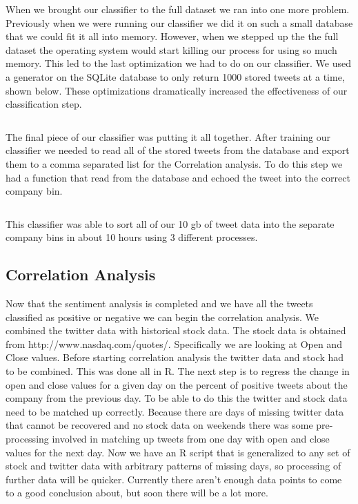 \documentclass{acm_proc_article-sp}
\begin{document}
When we brought our classifier to the full dataset we ran into one more problem. 
Previously when we were running our classifier we did it on such a small database that we 
could fit it all into memory. However, when we stepped up the the full dataset the operating
system would start killing our process for using so much memory. This led to the last
optimization we had to do on our classifier. We used a generator on the SQLite database
to only return 1000 stored tweets at a time, shown below. These optimizations dramatically 
increased the effectiveness of our classification step.

\inputminted{python}{examples/generator.py}

The final piece of our classifier was putting it all together. After training our classifier
we needed to read all of the stored tweets from the database and export them 
to a comma separated list for the Correlation analysis. To do this step we had a
function that read from the database and echoed the tweet into the correct company bin.

\inputminted{python}{examples/converter.py}

This classifier was able to sort all of our 10 gb of tweet data into the separate company bins
in about 10 hours using 3 different processes. 

\subsection{Correlation Analysis}

Now that the sentiment analysis is completed and we have all the tweets
classified as positive or negative we can begin the correlation analysis. We
combined the twitter data with historical stock data. The stock data is
obtained from http://www.nasdaq.com/quotes/. Specifically we are looking at
Open and Close values. Before starting correlation analysis the twitter data
and stock had to be combined. This was done all in R. The next step is to
regress the change in open and close values for a given day on the percent of
positive tweets about the company from the previous day. To be able to do this
the twitter and stock data need to be matched up correctly. Because there are
days of missing twitter data that cannot be recovered and no stock data on
weekends there was some pre-processing involved in matching up tweets from one
day with open and close values for the next day. Now we have an R script that
is generalized to any set of stock and twitter data with arbitrary patterns of
missing days, so processing of further data will be quicker. Currently there
aren't enough data points to come to a good conclusion about, but soon there
will be a lot more.
\end{document}
